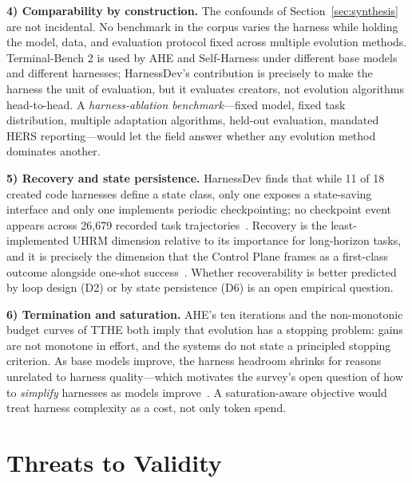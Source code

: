 \documentclass[conference]{IEEEtran}
\begin{document}
\textbf{4) Comparability by construction.} The confounds of Section~\ref{sec:synthesis} are not incidental. No benchmark in the corpus varies the harness while holding the model, data, and evaluation protocol fixed across multiple evolution methods. Terminal-Bench 2 is used by AHE and Self-Harness under different base models and different harnesses; HarnessDev's contribution is precisely to make the harness the unit of evaluation, but it evaluates creators, not evolution algorithms head-to-head. A \emph{harness-ablation benchmark}---fixed model, fixed task distribution, multiple adaptation algorithms, held-out evaluation, mandated HERS reporting---would let the field answer whether any evolution method dominates another.

\textbf{5) Recovery and state persistence.} HarnessDev finds that while 11 of 18 created code harnesses define a state class, only one exposes a state-saving interface and only one implements periodic checkpointing; no checkpoint event appears across 26{,}679 recorded task trajectories~\cite{b6}. Recovery is the least-implemented UHRM dimension relative to its importance for long-horizon tasks, and it is precisely the dimension that the Control Plane frames as a first-class outcome alongside one-shot success~\cite{b7}. Whether recoverability is better predicted by loop design (D2) or by state persistence (D6) is an open empirical question.

\textbf{6) Termination and saturation.} AHE's ten iterations and the non-monotonic budget curves of TTHE both imply that evolution has a stopping problem: gains are not monotone in effort, and the systems do not state a principled stopping criterion. As base models improve, the harness headroom shrinks for reasons unrelated to harness quality---which motivates the survey's open question of how to \emph{simplify} harnesses as models improve~\cite{b2}. A saturation-aware objective would treat harness complexity as a cost, not only token spend.

\section{Threats to Validity}
\label{sec:threats}
\end{document}
